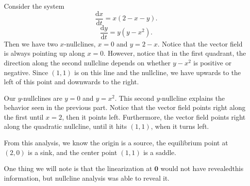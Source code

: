 Consider the system
\[
	\frac{\mathrm{d}x}{\mathrm{d}t} =x(2-x-y)
.\]
\[
	\frac{\mathrm{d}y}{\mathrm{d}t} =y(y-x^2)
.\]
Then we have two $x$-nullclines, $x=0$ and $y=2-x$. Notice that the vector field is always pointing up along $x=0$. However, notice that in the first quadrant, the direction along the second nullcline depends on whether $y-x^2$ is positive or negative. Since $(1,1)$ is on this line and the nullcline, we have upwards to the left of this point and downwards to the right.

Our $y$-nullclines are $y=0$ and $y=x^2$. This second $y$-nullcline explains the behavior seen in the previous part. Notice that the vector field points right along the first until $x=2$, then it points left. Furthermore, the vector field points right along the quadratic nullcline, until it hits $\left( 1,1 \right) $, when it turns left.

From this analysis, we know the origin is a source, the equilibrium point at $(2,0)$ is a sink, and the center point $(1,1)$ is a saddle.

One thing we will note is that the linearization at $\mathbf{0}$ would not have revealedthis information, but nullcline analysis was able to reveal it.


